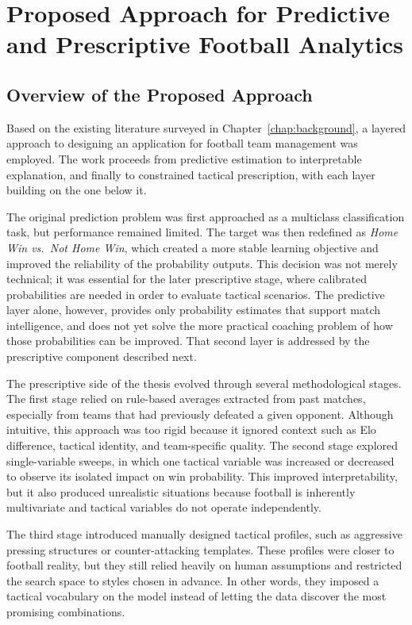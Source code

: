 \chapter{Proposed Approach for Predictive and Prescriptive Football Analytics}
\label{chap:approach}

\section{Overview of the Proposed Approach}
\label{sec:overview_approach}

Based on the existing literature surveyed in Chapter~\ref{chap:background}, a layered approach to designing an application for football team management was employed. The work proceeds from predictive estimation to interpretable explanation, and finally to constrained tactical prescription, with each layer building on the one below it.

The original prediction problem was first approached as a multiclass classification task, but performance remained limited. The target was then redefined as \emph{Home Win vs.\ Not Home Win}, which created a more stable learning objective and improved the reliability of the probability outputs. This decision was not merely technical; it was essential for the later prescriptive stage, where calibrated probabilities are needed in order to evaluate tactical scenarios. The predictive layer alone, however, provides only probability estimates that support match intelligence, and does not yet solve the more practical coaching problem of how those probabilities can be improved. That second layer is addressed by the prescriptive component described next.

The prescriptive side of the thesis evolved through several methodological stages. The first stage relied on rule-based averages extracted from past matches, especially from teams that had previously defeated a given opponent. Although intuitive, this approach was too rigid because it ignored context such as Elo difference, tactical identity, and team-specific quality. The second stage explored single-variable sweeps, in which one tactical variable was increased or decreased to observe its isolated impact on win probability. This improved interpretability, but it also produced unrealistic situations because football is inherently multivariate and tactical variables do not operate independently.

The third stage introduced manually designed tactical profiles, such as aggressive pressing structures or counter-attacking templates. These profiles were closer to football reality, but they still relied heavily on human assumptions and restricted the search space to styles chosen in advance. In other words, they imposed a tactical vocabulary on the model instead of letting the data discover the most promising combinations.

